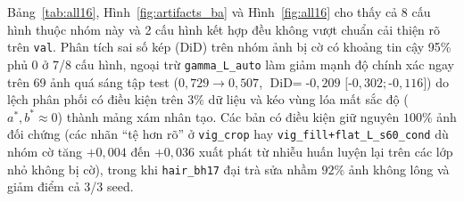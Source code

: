 \documentclass[10pt,twocolumn,a4paper]{article}
\begin{document}
Bảng~\ref{tab:all16}, Hình~\ref{fig:artifacts_ba} và Hình~\ref{fig:all16} cho thấy cả 8 cấu hình thuộc nhóm này và 2 cấu hình kết hợp đều không vượt chuẩn cải thiện rõ trên \texttt{val}. Phân tích sai số kép (DiD) trên nhóm ảnh bị cờ có khoảng tin cậy 95\% phủ 0 ở 7/8 cấu hình, ngoại trừ \texttt{gamma\_L\_auto} làm giảm mạnh độ chính xác ngay trên 69 ảnh quá sáng tập test ($0{,}729 \rightarrow 0{,}507$, $\text{DiD} = $-$0{,}209$ $[$-$0{,}302; $-$0{,}116]$) do lệch phân phối có điều kiện trên $3\%$ dữ liệu và kéo vùng lóa mất sắc độ ($a^*,b^*\approx 0$) thành mảng xám nhân tạo. Các bản có điều kiện giữ nguyên $100\%$ ảnh đối chứng (các nhãn ``tệ hơn rõ'' ở \texttt{vig\_crop} hay \texttt{vig\_fill+flat\_L\_s60\_cond} dù nhóm cờ tăng $+0{,}004$ đến $+0{,}036$ xuất phát từ nhiễu huấn luyện lại trên các lớp nhỏ không bị cờ), trong khi \texttt{hair\_bh17} đại trà sửa nhầm $92\%$ ảnh không lông và giảm điểm cả 3/3 seed.
\end{document}

